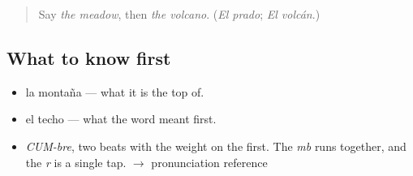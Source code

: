 \label{lesson:ES-C378-cumbre}



\begin{quote}
Say \emph{the meadow}, then \emph{the volcano}. (\emph{El prado}; \emph{El volcán}.)
\end{quote}

\subsection*{What to know first}
\begin{itemize}
\raggedright
  \item la montaña — what it is the top of.
  \item el techo — what the word meant first.
\end{itemize}

\begin{sounds}
\begin{itemize}
\raggedright
  \item \emph{CUM-bre}, two beats with the weight on the first. The \emph{mb} runs together, and the \emph{r} is a single tap. $\to$ pronunciation reference
\end{itemize}
\end{sounds}


